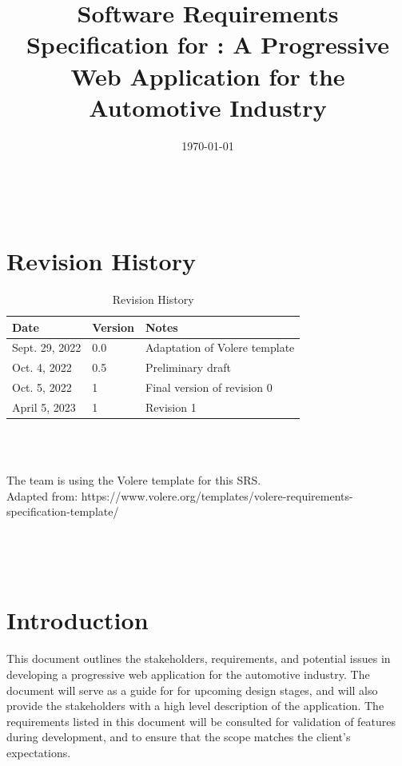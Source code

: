 \documentclass[12pt]{article}
\begin{document}
\title{Software Requirements Specification for \progname: A Progressive Web Application for the Automotive Industry} 
\author{\authname}
\date{\today}
	
\maketitle

~\newpage


\section*{Revision History}

\begin{table}[hp]
    \begin{tabularx}{\textwidth}{p{3cm}p{2cm}X}
    \toprule {\bf Date} & {\bf Version} & {\bf Notes}\\
    \midrule
    Sept. 29, 2022 & 0.0 & Adaptation of Volere template\\
    Oct. 4, 2022 & 0.5 & Preliminary draft\\
    Oct. 5, 2022 & 1 & Final version of revision 0\\
    April 5, 2023 & 1 & Revision 1\\
    \bottomrule
    \end{tabularx}\\ \\
    \caption{Revision History}
\end{table}

\noindent The team is using the Volere template for this SRS.\\
Adapted from: https://www.volere.org/templates/volere-requirements-specification-template/

~\newpage

\tableofcontents

\listoftables

\listoffigures

~\newpage

\section{Introduction}
This document outlines the stakeholders, requirements, and potential issues in 
developing a progressive web application for the automotive industry. 
The document will serve as a guide for for upcoming design stages, and will 
also provide the stakeholders with a high level description of the application.
The requirements listed in this document will be consulted for validation of
features during development, and to ensure that the scope matches the client's
expectations.
\end{document}
